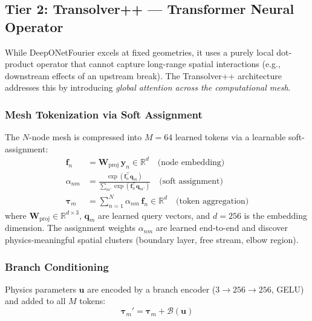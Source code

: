 \documentclass[conference]{IEEEtran}
\begin{document}
\subsection{Tier 2: Transolver++ --- Transformer Neural Operator}
\label{sec:transolver}

While DeepONetFourier excels at fixed geometries, it uses a purely local dot-product operator that cannot capture long-range spatial interactions (e.g., downstream effects of an upstream break). The Transolver++ architecture \cite{wu2024transolver} addresses this by introducing \emph{global attention across the computational mesh}.

\subsubsection{Mesh Tokenization via Soft Assignment}
The $N$-node mesh is compressed into $M = 64$ learned tokens via a learnable soft-assignment:
\begin{align}
\bm{f}_n &= \bm{W}_\text{proj}\,\bm{y}_n \in \mathbb{R}^{d} \quad\text{(node embedding)} \label{eq:node_embed}\\
\alpha_{nm} &= \frac{\exp(\bm{f}_n^\top \bm{q}_m)}{\sum_{m'}\exp(\bm{f}_n^\top \bm{q}_{m'})} \quad\text{(soft assignment)} \label{eq:soft_assign}\\
\bm{\tau}_m &= \sum_{n=1}^{N} \alpha_{nm}\,\bm{f}_n \in \mathbb{R}^{d} \quad\text{(token aggregation)} \label{eq:token_agg}
\end{align}
where $\bm{W}_\text{proj} \in \mathbb{R}^{d \times 3}$, $\bm{q}_m$ are learned query vectors, and $d = 256$ is the embedding dimension. The assignment weights $\alpha_{nm}$ are learned end-to-end and discover physics-meaningful spatial clusters (boundary layer, free stream, elbow region).

\subsubsection{Branch Conditioning}
Physics parameters $\bm{u}$ are encoded by a branch encoder ($3 \to 256 \to 256$, GELU) and added to all $M$ tokens:
\begin{equation}
\bm{\tau}_m' = \bm{\tau}_m + \mathcal{B}(\bm{u})
\label{eq:branch_cond}
\end{equation}
\end{document}

